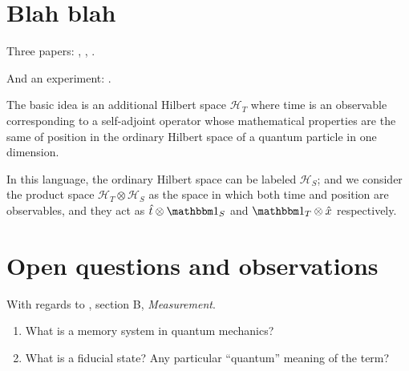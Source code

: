 \section{Blah blah}

Three papers: \cite{Lloyd:Time}, \cite{Marletto:Evolution}, \cite{Prvanovic}.

And an experiment: \cite{Moreva:synthetic}.

The basic idea is an additional Hilbert space $\mathcal{H}_T$ where time is an observable
corresponding to
a self-adjoint operator whose mathematical properties are the same of position in the
ordinary Hilbert space of a quantum particle in one dimension.

In this language, the ordinary Hilbert space can be labeled $\mathcal{H}_S$;
and we consider the product space $\mathcal{H}_T \otimes \mathcal{H}_S$ as
the space in which both time and position are observables, and they act as
$\hat{t} \otimes \idop_S$ and $\idop_T \otimes \hat{x}$
respectively.

\section{Open questions and observations}

With regards to \cite{Lloyd:Time}, section B, \textit{Measurement}.

\begin{enumerate}
  \item What is a memory system in quantum mechanics? 
  \item What is a fiducial state? Any particular ``quantum'' meaning of the term?
\end{enumerate}
